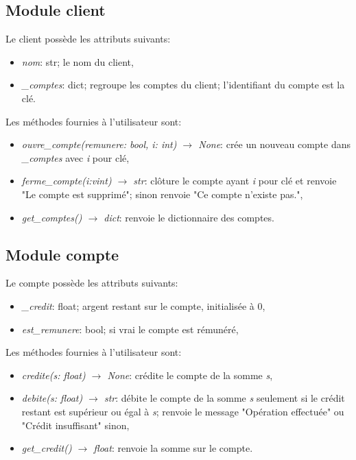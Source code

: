 \documentclass[a4paper,11pt]{article}
\begin{document}
\begin{Form}
\subsection{Module client}
Le client possède les attributs suivants:
\begin{itemize}
\item \emph{nom}: str; le nom du client,
\item \emph{\_comptes}: dict; regroupe les comptes du client; l'identifiant du compte est la clé.
\end{itemize}
Les méthodes fournies à l'utilisateur sont:
\begin{itemize}
\item \emph{ouvre\_compte(remunere: bool, i: int) $\rightarrow$ None}: crée un nouveau compte dans \emph{\_comptes} avec \emph{i} pour clé,
\item \emph{ferme\_compte(i:vint) $\rightarrow$ str}: clôture le compte ayant \emph{i} pour clé et renvoie "Le compte est supprimé"; sinon renvoie "Ce compte n'existe pas.",
\item \emph{get\_comptes() $\rightarrow$ dict}: renvoie le dictionnaire des comptes.
\end{itemize}
\subsection{Module compte}
Le compte possède les attributs suivants:
\begin{itemize}
\item \emph{\_credit}: float; argent restant sur le compte, initialisée à 0,
\item \emph{est\_remunere}: bool; si vrai le compte est rémunéré,
\end{itemize}
Les méthodes fournies à l'utilisateur sont:
\begin{itemize}
\item \emph{credite(s: float) $\rightarrow$ None}: crédite le compte de la somme \emph{s},
\item \emph{debite(s: float) $\rightarrow$ str}: débite le compte de la somme \emph{s} seulement si le crédit restant est supérieur ou égal à \emph{s}; renvoie le message "Opération effectuée" ou "Crédit insuffisant" sinon,
\item \emph{get\_credit() $\rightarrow$ float}: renvoie la somme sur le compte.
\end{itemize}

\end{Form}
\end{document}
